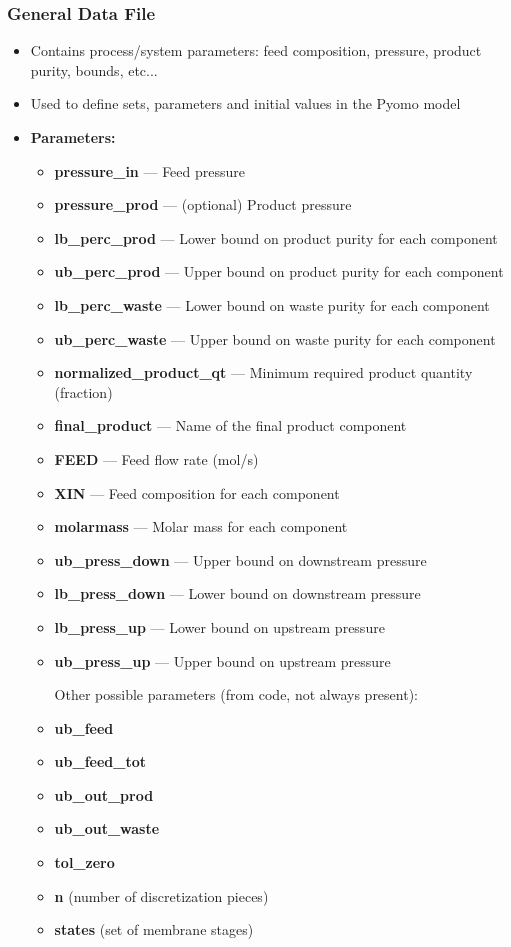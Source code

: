 \documentclass[12pt]{article}
\theoremstyle{definition}
\theoremstyle{definition}
\theoremstyle{remark}
\theoremstyle{remark}
\theoremstyle{definition}
\theoremstyle{remark}
\begin{document}
\subsubsection{General Data File}
\begin{itemize}
	\item Contains process/system parameters: feed composition, pressure, product purity, bounds, etc...
	\item Used to define sets, parameters and initial values in the Pyomo model
	\item \textbf{Parameters:}
		\begin{itemize}
			\item \textbf{pressure\_in }— Feed pressure
			\item \textbf{pressure\_prod }— (optional) Product pressure
			\item \textbf{lb\_perc\_prod }— Lower bound on product purity for each component
			\item \textbf{ub\_perc\_prod }— Upper bound on product purity for each component
			\item \textbf{lb\_perc\_waste }— Lower bound on waste purity for each component
			\item \textbf{ub\_perc\_waste }— Upper bound on waste purity for each component
			\item \textbf{normalized\_product\_qt }— Minimum required product quantity (fraction)
			\item \textbf{final\_product }— Name of the final product component
			\item \textbf{FEED }— Feed flow rate (mol/s)
			\item \textbf{XIN }— Feed composition for each component
			\item \textbf{molarmass }— Molar mass for each component
			\item \textbf{ub\_press\_down }— Upper bound on downstream pressure
			\item \textbf{lb\_press\_down }— Lower bound on downstream pressure
			\item \textbf{lb\_press\_up }— Lower bound on upstream pressure
			\item \textbf{ub\_press\_up }— Upper bound on upstream pressure

			Other possible parameters (from code, not always present):
			\item \textbf{ub\_feed}
			\item \textbf{ub\_feed\_tot}
			\item \textbf{ub\_out\_prod}
			\item \textbf{ub\_out\_waste}
			\item \textbf{tol\_zero}
			\item \textbf{n} (number of discretization pieces)
			\item \textbf{states} (set of membrane stages)
			
		\end{itemize}
	
\end{itemize}
\end{document}
